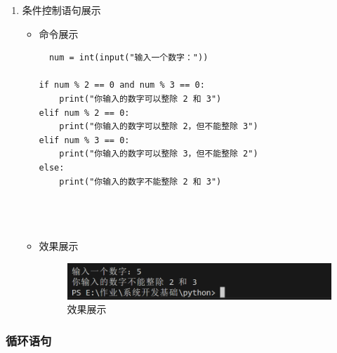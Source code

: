 \documentclass[UTF8]{ctexart}
\begin{document}
\begin{enumerate}
  \item 条件控制语句展示
  \begin{itemize}
  \item 命令展示
  \begin{verbatim}
  num = int(input("输入一个数字："))

if num % 2 == 0 and num % 3 == 0:
    print("你输入的数字可以整除 2 和 3")
elif num % 2 == 0:
    print("你输入的数字可以整除 2，但不能整除 3")
elif num % 3 == 0:
    print("你输入的数字可以整除 3，但不能整除 2")
else:
    print("你输入的数字不能整除 2 和 3")


    
  \end{verbatim}

  \item 效果展示
  \begin{figure}[H]
    \centering
    \includegraphics[width=\textwidth]{25} %
    \caption{效果展示}
  
  \end{figure}
\end{itemize}
\end{enumerate}





















\subsubsection{循环语句}
\end{document}
